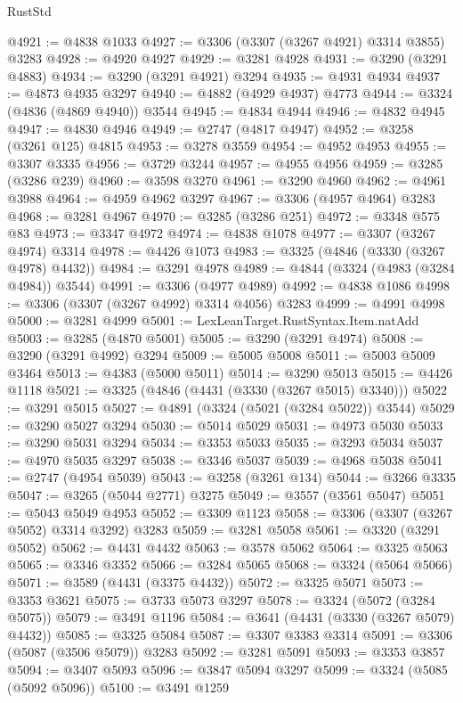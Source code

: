 \begin{lexlean}{RustStd}
\begin{coremodule}
@4921 := @4838 @1033
@4927 := @3306 (@3307 (@3267 @4921) @3314 @3855) @3283
@4928 := @4920 @4927
@4929 := @3281 @4928
@4931 := @3290 (@3291 @4883)
@4934 := @3290 (@3291 @4921) @3294
@4935 := @4931 @4934
@4937 := @4873 @4935 @3297
@4940 := @4882 (@4929 @4937) @4773
@4944 := @3324 (@4836 (@4869 @4940)) @3544
@4945 := @4834 @4944
@4946 := @4832 @4945
@4947 := @4830 @4946
@4949 := @2747 (@4817 @4947)
@4952 := @3258 (@3261 @125) @4815
@4953 := @3278 @3559
@4954 := @4952 @4953
@4955 := @3307 @3335
@4956 := @3729 @3244
@4957 := @4955 @4956
@4959 := @3285 (@3286 @239)
@4960 := @3598 @3270
@4961 := @3290 @4960
@4962 := @4961 @3988
@4964 := @4959 @4962 @3297
@4967 := @3306 (@4957 @4964) @3283
@4968 := @3281 @4967
@4970 := @3285 (@3286 @251)
@4972 := @3348 @575 @83
@4973 := @3347 @4972
@4974 := @4838 @1078
@4977 := @3307 (@3267 @4974) @3314
@4978 := @4426 @1073
@4983 := @3325 (@4846 (@3330 (@3267 @4978) @4432))
@4984 := @3291 @4978
@4989 := @4844 (@3324 (@4983 (@3284 @4984)) @3544)
@4991 := @3306 (@4977 @4989)
@4992 := @4838 @1086
@4998 := @3306 (@3307 (@3267 @4992) @3314 @4056) @3283
@4999 := @4991 @4998
@5000 := @3281 @4999
@5001 := LexLeanTarget.RustSyntax.Item.natAdd
@5003 := @3285 (@4870 @5001)
@5005 := @3290 (@3291 @4974)
@5008 := @3290 (@3291 @4992) @3294
@5009 := @5005 @5008
@5011 := @5003 @5009 @3464
@5013 := @4383 (@5000 @5011)
@5014 := @3290 @5013
@5015 := @4426 @1118
@5021 := @3325 (@4846 (@4431 (@3330 (@3267 @5015) @3340)))
@5022 := @3291 @5015
@5027 := @4891 (@3324 (@5021 (@3284 @5022)) @3544)
@5029 := @3290 @5027 @3294
@5030 := @5014 @5029
@5031 := @4973 @5030
@5033 := @3290 @5031 @3294
@5034 := @3353 @5033
@5035 := @3293 @5034
@5037 := @4970 @5035 @3297
@5038 := @3346 @5037
@5039 := @4968 @5038
@5041 := @2747 (@4954 @5039)
@5043 := @3258 (@3261 @134)
@5044 := @3266 @3335
@5047 := @3265 (@5044 @2771) @3275
@5049 := @3557 (@3561 @5047)
@5051 := @5043 @5049 @4953
@5052 := @3309 @1123
@5058 := @3306 (@3307 (@3267 @5052) @3314 @3292) @3283
@5059 := @3281 @5058
@5061 := @3320 (@3291 @5052)
@5062 := @4431 @4432
@5063 := @3578 @5062
@5064 := @3325 @5063
@5065 := @3346 @3352
@5066 := @3284 @5065
@5068 := @3324 (@5064 @5066)
@5071 := @3589 (@4431 (@3375 @4432))
@5072 := @3325 @5071
@5073 := @3353 @3621
@5075 := @3733 @5073 @3297
@5078 := @3324 (@5072 (@3284 @5075))
@5079 := @3491 @1196
@5084 := @3641 (@4431 (@3330 (@3267 @5079) @4432))
@5085 := @3325 @5084
@5087 := @3307 @3383 @3314
@5091 := @3306 (@5087 (@3506 @5079)) @3283
@5092 := @3281 @5091
@5093 := @3353 @3857
@5094 := @3407 @5093
@5096 := @3847 @5094 @3297
@5099 := @3324 (@5085 (@5092 @5096))
@5100 := @3491 @1259

\end{coremodule}
\end{lexlean}
